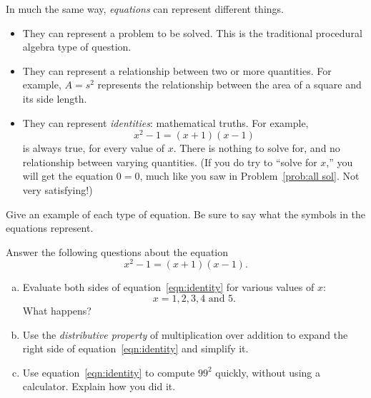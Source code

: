 In much the same way, \emph{equations} can represent different things.
\begin{itemize}
\item
They can represent a problem to be solved.  This is the traditional procedural algebra type of question.\\
\item
They can represent a relationship between two or more quantities.  For example, $A = s^2$ represents the relationship between the area of a square and its side length.\\
\item
They can represent \emph{identities}: mathematical truths.  For example, 
\[
x^2 - 1 = (x+1)(x-1)
\]
 is always true, for every value of $x$.  There is nothing to solve for, and no relationship between varying quantities.  (If you do try to ``solve for $x$,'' you will get the equation $0=0$, much like you saw in Problem~\ref{prob:all sol}.  Not very satisfying!)\\
\end{itemize}


\bigskip


\begin{thinkpair*}
Give an example of each type of equation.  Be sure to say what the symbols in the equations represent.
\end{thinkpair*}


\bigskip
\bigskip

\begin{problem}
Answer the following questions about the equation
\begin{equation}\label{eqn:identity}
x^2 - 1 = (x+1)(x-1).
\end{equation}
\begin{enumerate}[(a)]
\item
Evaluate both sides of equation~\ref{eqn:identity} for various values of $x$: 
\[
x = 1, 2, 3, 4 \text{ and } 5.
\]
What happens?\\

\item 
Use the \emph{distributive property} of multiplication over addition to expand the right side of equation~\ref{eqn:identity} and simplify it.  \\

\item
Use equation~\ref{eqn:identity} to compute $99^2$ quickly, without using a calculator.  Explain how you did it.
\end{enumerate}

\end{problem}






